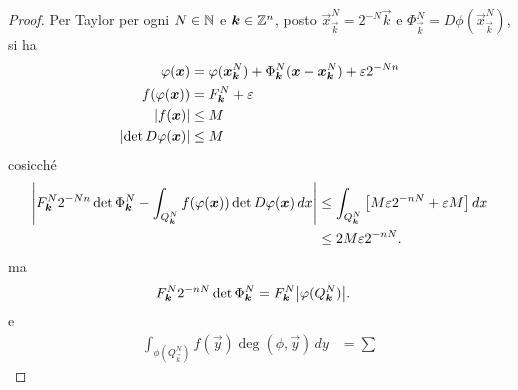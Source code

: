 \begin{proof}
Per Taylor per ogni $N\in {\mathbb N}$ e $\boldsymbol k\in {\mathbb Z}^n$,
posto ${\vec x}^N_{\vec k} = 2^{-N}\vec k$ e $\Phi^N_{\vec k}=D\phi({\vec x}^N_{\vec k})$,
si ha 
\begin{align*}
  \varphi(\boldsymbol x) &= \varphi({\boldsymbol x}^N_{\boldsymbol k}) + \Phi^N_{\boldsymbol k} (\boldsymbol x - {\boldsymbol x}^N_{\boldsymbol k}) + \varepsilon 2^{-Nn}\\
  f(\varphi(\boldsymbol x)) &= F^N_{\boldsymbol k} + \varepsilon\\
  {\left|f(\boldsymbol x)\right|} & \le M\\
  {\left|\det D\varphi(\boldsymbol x)\right|} & \le M\\
\end{align*}
cosicché
\begin{align}
  {\left|
    F^N_{\boldsymbol k}  2^{-Nn} \det \Phi^N_{\boldsymbol k}
    - \int_{Q^N_{\boldsymbol k}} f(\varphi(\boldsymbol x)) \det D\varphi(\boldsymbol x)\, dx
  \right|}
  &\le \int_{Q^N_{\boldsymbol k}}  {\left[ M \varepsilon 2^{-nN} + \varepsilon M \right]}\, dx \\
  &\le 2M\varepsilon 2^{-nN}. 
\end{align}
ma 
\begin{align*}
    F^N_{\boldsymbol k} 2^{-nN} \det \Phi^N_{\boldsymbol k} 
    &= F^N_{\boldsymbol k}{\left|\varphi(Q^N_{\boldsymbol k})\right|}.
\end{align*}
e
\begin{align*}
  \int_{\phi(Q^N_{\vec k})} f(\vec y) \deg(\phi,\vec y)\, dy 
  &=
  \sum
\end{align*}
\end{proof}